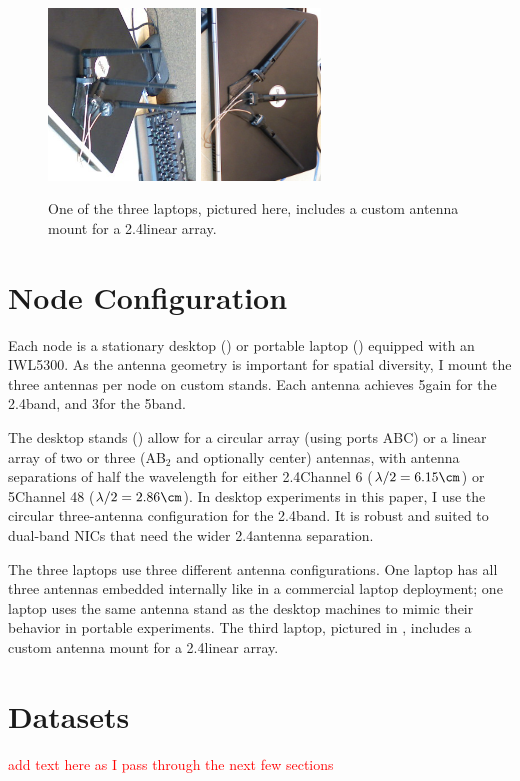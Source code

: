 \begin{figure}[h]
	\centering
	\includegraphics[angle=90,height=1.8in]{figures/laptop_stand_cropped_up.png}%
	\hspace{0.6in}%
	\includegraphics[angle=90,height=1.8in]{figures/laptop_stand_cropped.png}
	\caption{\label{fig:laptop_stands}One of the three laptops, pictured here, includes a custom antenna mount for a 2.4\GHz linear array.}
\end{figure}

\section{Node Configuration}
Each node is a stationary desktop () or portable laptop () equipped with an IWL5300. As the antenna geometry is important for spatial diversity, I mount the three antennas per node on custom stands. Each antenna achieves 5\dBi gain for the 2.4\GHz band, and 3\dBi for the 5\GHz band.

The desktop stands () allow for a circular array (using ports ABC) or a linear array of two or three (AB$_2$ and optionally center) antennas, with antenna separations of half the wavelength for either 2.4\GHz Channel 6 ($\lambda/2 = 6.15\cm$) or 5\GHz Channel 48 ($\lambda/2=2.86\cm$). In desktop experiments in this paper, I use the circular three-antenna configuration for the 2.4\GHz band. It is robust and suited to dual-band NICs that need the wider 2.4\GHz antenna separation. 

The three laptops use three different antenna configurations. One laptop has all three antennas embedded internally like in a commercial laptop deployment; one laptop uses the same antenna stand as the desktop machines to mimic their behavior in portable experiments. The third laptop, pictured in , includes a custom antenna mount for a 2.4\GHz linear array.
\section{Datasets}
\textcolor{red}{add text here as I pass through the next few sections}

\ifx\mainfile\undefined

\fi